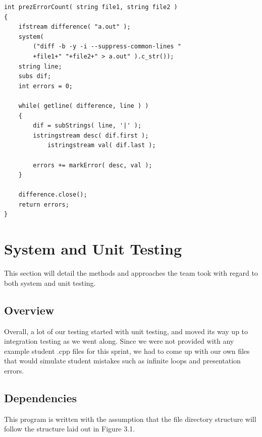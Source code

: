 \documentclass {article}
\begin{document}
\begin{lstlisting}
int prezErrorCount( string file1, string file2 ) 
{
	ifstream difference( "a.out" );
	system(
		("diff -b -y -i --suppress-common-lines "
		+file1+" "+file2+" > a.out" ).c_str());
	string line;
	subs dif;
	int errors = 0;
	
	while( getline( difference, line ) )
	{
		dif = subStrings( line, '|' ); 
		istringstream desc( dif.first );
 	        istringstream val( dif.last );
		
		errors += markError( desc, val );
	}	

	difference.close();
	return errors;
}
\end{lstlisting}	


	\newpage
	
	\section{\LARGE{\color{blue}System and Unit Testing}}
		This section will detail the methods and approaches the team took with regard to both
		 system and unit testing.
		 
		\subsection{\Large{\color{blue}Overview}}
			Overall, a lot of our testing started with unit testing, and moved its way up to
			 integration testing as we went along. Since we were not provided with any example
			 student .cpp files for this sprint, we had to come up with our own files that would
			 simulate student mistakes such as infinite loops and presentation errors.
			 
		\subsection{\Large{\color{blue}Dependencies}}
			This program is written with the assumption that the file directory structure will
			 follow the structure laid out in Figure 3.1.
			 
\end{document}
